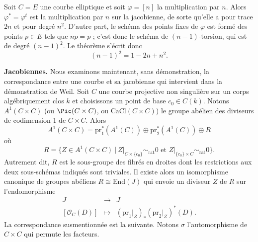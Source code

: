 \begin{example}
\label{example-elliptic-curve}
Soit $C = E$ une courbe elliptique et soit $\varphi = [n]$ la multiplication par $n$.
Alors $\varphi^* = \varphi^t$ est la multiplication par $n$ sur la jacobienne, de sorte qu'elle
a pour trace $2n$ et pour degré $n^2$. D'autre part, le schéma des points fixes de
$\varphi$ est formé des points $p \in E$ tels que $n p = p$ ; c'est donc le schéma de
$(n-1)$-torsion, qui est de degré $(n-1)^2$. Le théorème s'écrit donc
$$
(n-1)^2 = 1 - 2n + n^2.
$$
\end{example}

\noindent
{\bf Jacobiennes.}
Nous examinons maintenant, sans démonstration, la correspondance entre une courbe et sa
jacobienne qui intervient dans la démonstration de Weil. Soit $C$ une courbe projective non singulière
sur un corps algébriquement clos $k$ et choisissons un point de base $c_0 \in
C(k)$. Notons $A^1(C \times C)$ (ou $\Pic(C \times C)$, ou
$\text{CaCl}(C \times C)$) le groupe abélien des diviseurs de codimension 1 de
$C \times C$. Alors
$$
A^1(C \times C) = \text{pr}_1^* (A^1(C)) \oplus \text{pr}_2^* (A^1(C)) \oplus R
$$
où
$$
R = \{ Z \in A^1(C \times C) \ |
\ Z|_{C \times \{c_0\}} \sim_\text{rat} 0
\text{ et }
Z|_{\{c_0\} \times C} \sim_\text{rat} 0 \}.
$$
Autrement dit,
$R$ est le sous-groupe des fibrés en droites dont les restrictions aux
deux sous-schémas indiqués sont triviales. Il existe alors un isomorphisme canonique de groupes abéliens $R
\cong \text{End}(J)$ qui envoie un diviseur $Z$ de $R$ sur l'endomorphisme
$$
\begin{matrix}
J & \to & J \\
\left[ \mathcal{O}_C(D) \right] & \mapsto & (\text{pr}_1 |_Z)_* (\text{pr}_2
|_Z)^* (D).
\end{matrix}
$$
La correspondance susmentionnée est la suivante. Notons $\sigma$
l'automorphisme de $C \times C$ qui permute les facteurs.
